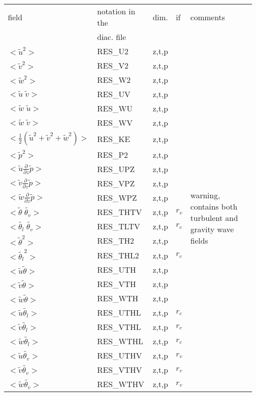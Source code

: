 \begin{center}
\begin{makeimage}
\begin{tabular}{||p{6cm}|>{\centering}p{2.5cm}|>{\centering}p{1.5cm}|>{\centering}p{0.5cm}|p{5cm }||}
\hline
\hline
field & notation in the & dim. &if     & comments \\
      & diac. file &           &  & \\
\hline
\hline
$<\tilde{u}^2>$ & RES\_U2 & z,t,p & &\multirow{25}{5cm}{warning, contains both turbulent and gravity wave fields }\\
\cline{1-4}
$<\tilde{v}^2>$ & RES\_V2 &z,t,p &   & \\
\cline{1-4}
$<\tilde{w}^2>$ & RES\_W2 &z,t,p &   & \\
\cline{1-4}
$<\tilde{u}\;\tilde{v}>$ & RES\_UV &z,t,p &   &\\
\cline{1-4}
$<\tilde{w}\;\tilde{u}>$ & RES\_WU &z,t,p &   & \\
\cline{1-4}
$<\tilde{w}\;\tilde{v}>$ & RES\_WV &z,t,p &   &\\
\cline{1-4}
$<\frac{1}{2}(\tilde{u}^2+\tilde{v}^2+\tilde{w}^2)>$ & RES\_KE &z,t,p &   &\\
\cline{1-4}
$<\tilde{p}^2>$ & RES\_P2 & z,t,p &  & \\
\cline{1-4}
$<\tilde{u}\frac{\partial}{\partial z}\tilde{p}>$ & RES\_UPZ & z,t,p &  &\\
\cline{1-4}
$<\tilde{v}\frac{\partial}{\partial z}\tilde{p}>$ & RES\_VPZ & z,t,p &  &\\
\cline{1-4}
$<\tilde{w}\frac{\partial}{\partial z}\tilde{p}>$ & RES\_WPZ & z,t,p &  &\\
\cline{1-4}
$<\tilde{\theta}\;\tilde{\theta_v}>$ & RES\_THTV &z,t,p &  $r_v$  &\\
\cline{1-4}
$<\tilde{\theta_l}\;\tilde{\theta_v}>$ & RES\_TLTV &z,t,p &  $r_c$  &\\
\cline{1-4}
$<\tilde{\theta}^2>$ & RES\_TH2 &z,t,p &   &\\
\cline{1-4}
$<\tilde{\theta_l}^2>$ & RES\_THL2 &z,t,p &  $r_c$  &\\
\cline{1-4}
$<\tilde{u}\tilde{\theta}>$ & RES\_UTH &z,t,p &   & \\
\cline{1-4}
$<\tilde{v}\tilde{\theta}>$ & RES\_VTH &z,t,p &   &\\
\cline{1-4}
$<\tilde{w}\tilde{\theta}>$ & RES\_WTH &z,t,p &   &\\
\cline{1-4}
$<\tilde{u}\tilde{\theta_l}>$ & RES\_UTHL &z,t,p &  $r_c$  &\\
\cline{1-4}
$<\tilde{v}\tilde{\theta_l}>$ & RES\_VTHL &z,t,p &   $r_c$ &\\
\cline{1-4}
$<\tilde{w}\tilde{\theta_l}>$ & RES\_WTHL &z,t,p &   $r_c$ &\\
\cline{1-4}
$<\tilde{u}\tilde{\theta_v}>$ & RES\_UTHV &z,t,p &  $r_v$  &\\
\cline{1-4}
$<\tilde{v}\tilde{\theta_v}>$ & RES\_VTHV &z,t,p &   $r_v$ &\\
\cline{1-4}
$<\tilde{w}\tilde{\theta_v}>$ & RES\_WTHV &z,t,p &   $r_v$ &\\
\hline
\hline
\end{tabular}
\end{makeimage}
\end{center}

